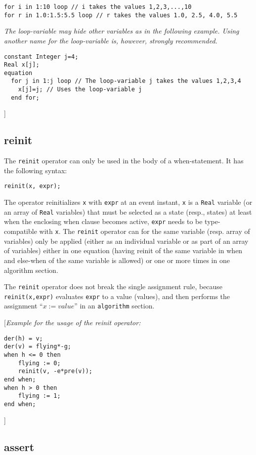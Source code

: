 \documentclass[11pt,a4paper,notitlepage]{report}
\begin{document}
\begin{verbatim}
for i in 1:10 loop // i takes the values 1,2,3,...,10
for r in 1.0:1.5:5.5 loop // r takes the values 1.0, 2.5, 4.0, 5.5
\end{verbatim}

\emph{The loop-variable may hide other variables as in the following example. Using another name for the loop-variable is, however, strongly recommended.}

\begin{verbatim}
constant Integer j=4;
Real x[j];
equation
  for j in 1:j loop // The loop-variable j takes the values 1,2,3,4
    x[j]=j; // Uses the loop-variable j
  end for;
\end{verbatim}
]

\subsection{reinit} \label{equations:reinit}
The \verb"reinit" operator can only be used in the body of a when-statement. It has the following
syntax:
\begin{verbatim}
reinit(x, expr);
\end{verbatim}

The operator reinitializes \verb"x" with \verb"expr" at an event instant, \verb"x" is a \verb"Real" variable (or an array of \verb"Real" variables) that must be selected as a state (resp., states) at least when the enclosing when clause becomes active, \verb"expr" needs to be type-compatible with \verb"x". The \verb"reinit" operator can for the same variable (resp. array of variables) only be applied (either as an individual variable or as part of an array of variables) either in one equation (having reinit of the same variable in when and else-when of the same variable is allowed) or one or more times in one algorithm section.

The \verb"reinit" operator does not break the single assignment rule, because \verb"reinit(x,expr)"  evaluates \verb"expr" to a value (values), and then performs the assignment “$x := value$” in an \verb"algorithm" section. 

[\emph{Example for the usage of the reinit operator:}
\begin{verbatim}
der(h) = v;
der(v) = flying*-g;
when h <= 0 then
	flying := 0;	
	reinit(v, -e*pre(v));
end when;
when h > 0 then
	flying := 1;
end when;
\end{verbatim}
]

\subsection{assert} \label{equations:assert}
\end{document}
